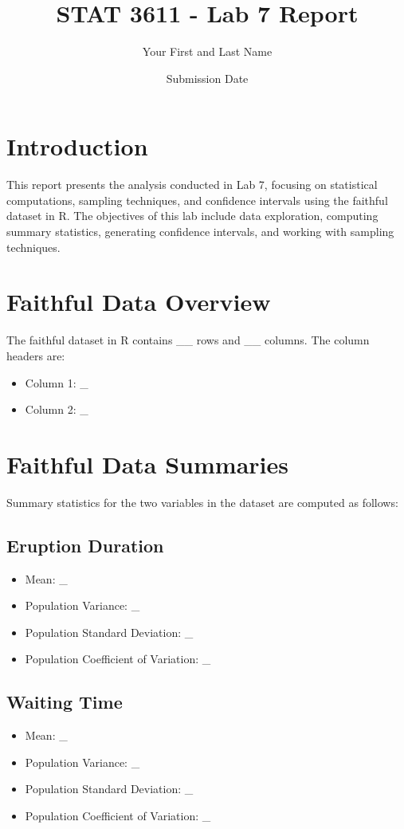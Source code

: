 \documentclass{article}
\title{STAT 3611 - Lab 7 Report}
\author{Your First and Last Name}
\date{Submission Date}
\begin{document}
\maketitle

\section{Introduction}

This report presents the analysis conducted in Lab 7, focusing on statistical computations, sampling techniques, and confidence intervals using the faithful dataset in R. The objectives of this lab include data exploration, computing summary statistics, generating confidence intervals, and working with sampling techniques.

\section{Faithful Data Overview}

The faithful dataset in R contains \_\_ rows and \_\_ columns. The column headers are:

\begin{itemize}
    \item Column 1: \_
    \item Column 2: \_
\end{itemize}

\section{Faithful Data Summaries}

Summary statistics for the two variables in the dataset are computed as follows:

\subsection{Eruption Duration}
\begin{itemize}
    \item Mean: \_
    \item Population Variance: \_
    \item Population Standard Deviation: \_
    \item Population Coefficient of Variation: \_
\end{itemize}

\subsection{Waiting Time}
\begin{itemize}
    \item Mean: \_
    \item Population Variance: \_
    \item Population Standard Deviation: \_
    \item Population Coefficient of Variation: \_
\end{itemize}
\end{document}
